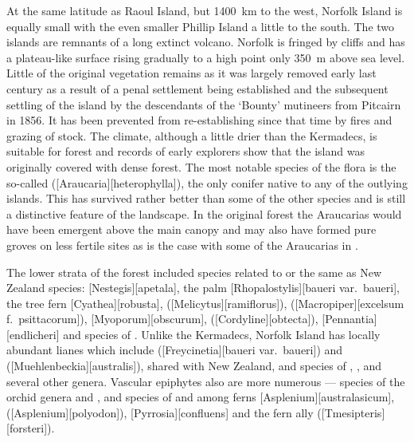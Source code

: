At the same latitude as Raoul Island, but \SI{1400}{\kilo\metre} to the west, Norfolk Island is equally small with the even smaller Phillip Island a little to the south.
The two islands are remnants of a long extinct volcano.
Norfolk is fringed by cliffs and has a plateau-like surface rising gradually to a high point only \SI{350}{\metre} above sea level.
Little of the original vegetation remains as it was largely removed early last century as a result of a penal settlement being established and the subsequent settling of the island by the descendants of the `Bounty' mutineers from Pitcairn in 1856.
It has been prevented from re-establishing since that time by fires and grazing of stock.
The climate, although a little drier than the Kermadecs, is suitable for forest and records of early explorers show that the island was originally covered with dense forest.
The most notable species of the flora is the so-called  ([Araucaria][heterophylla]), the only conifer native to any of the outlying islands.
This has survived rather better than some of the other species and is still a distinctive feature of the landscape.
In the original forest the Araucarias would have been emergent above the main canopy and may also have formed pure groves on less fertile sites as is the case with some of the Araucarias in .

The lower strata of the forest included species related to or the same as New Zealand species: [Nestegis][apetala], the palm [Rhopalostylis][baueri var.\ baueri], the tree fern [Cyathea][robusta],  ([Melicytus][ramiflorus]),  ([Macropiper][excelsum f.\ psittacorum]), [Myoporum][obscurum],  ([Cordyline][obtecta]), [Pennantia][endlicheri] and species of .
Unlike the Kermadecs, Norfolk Island has locally abundant lianes which include  ([Freycinetia][baueri var.\ baueri]) and  ([Muehlenbeckia][australis]), shared with New Zealand, and species of , ,  and several other genera.
Vascular epiphytes also are more numerous --- species of the orchid genera  and , and species of  and among ferns [Asplenium][australasicum],  ([Asplenium][polyodon]), [Pyrrosia][confluens] and the fern ally  ([Tmesipteris][forsteri]).

